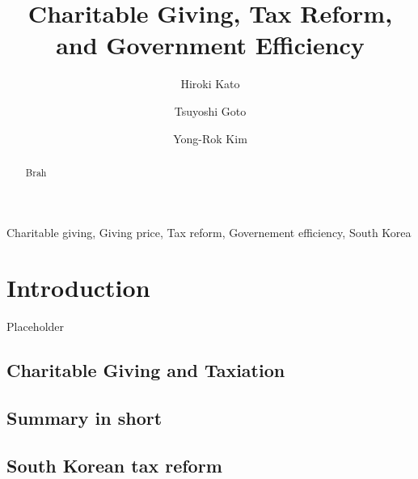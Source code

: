 \documentclass[ review  , 3p ]{elsarticle}
\begin{document}
  \begin{frontmatter}

    \title{Charitable Giving, Tax Reform, and Government Efficiency}
                \author[Osaka University]{
      Hiroki Kato 
       \corref{*} }
        \author[Chiba University]{
      Tsuyoshi Goto 
      }
        \author[Kobe University]{
      Yong-Rok Kim 
      }
            \address[Osaka University]{Graduate School of Economics, Osaka University, Japan}
        \address[Chiba University]{Graduate School of Economics, Chiba University, Japan}
        \address[Kobe University]{Graduate School of Economics, Kobe University, Japan}
      
        \begin{abstract}
      Brah
    \end{abstract}
      
        \begin{keyword}
      Charitable giving, Giving price, Tax reform, Governement efficiency, South Korea
    \end{keyword}
    
  \end{frontmatter}

  \hypertarget{introduction}{%
  \section{Introduction}\label{introduction}}
  
  Placeholder
  
  \hypertarget{charitable-giving-and-taxiation}{%
  \subsection{Charitable Giving and Taxiation}\label{charitable-giving-and-taxiation}}
  
  \hypertarget{summary-in-short}{%
  \subsection{Summary in short}\label{summary-in-short}}
  
  \hypertarget{south-korean-tax-reform}{%
  \subsection{South Korean tax reform}\label{south-korean-tax-reform}}
  
\end{document}
